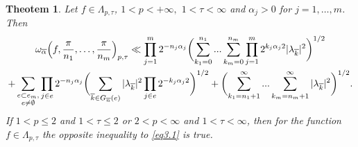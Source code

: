 \documentclass[12pt]{article}
\theoremstyle{plain}
\newtheorem{theorem}{Theotem}[section]
\begin{document}
\begin{theorem}\label{th3.2} 
Let $f \in \Lambda_{p ,\tau}$, $1 < p < +\infty,$ $1< \tau< \infty$ and $\alpha_{j}> 0$ for $j=1,\ldots,m$.
Then 
\begin{multline}\label{eq3.1}
 \omega_{\overline\alpha}\Bigl(f,\frac{\pi}{n_{1}},\ldots, \frac{\pi}{n_{m}}\Bigr)_{p, \tau}  \ll \prod_{j=1}^{m}2^{-n_{j}\alpha_{j}}\biggl(\sum\limits_{k_{1}=0}^{n_{1}}...\sum\limits_{k_{m}=0}^{n_{m}}\prod_{j=1}^{m}2^{k_{j}\alpha_{j}2}|\lambda_{\overline{k}}|^{2} \biggr)^{1/2}
 \\
  + \sum_{\substack{e\subset e_{m},\\ e\neq \emptyset}} \prod_{j\in e}2^{-n_{j}\alpha_{j}}\biggl(\sum\limits_{\overline{k}\in G_{\overline{n}}(e)}|\lambda_{\overline{k}}|^{2}\prod_{j\in e}2^{-k_{j}\alpha_{j}2} \biggr)^{1/2} + \biggl(\sum\limits_{k_{1}=n_{1}+1}^{\infty}...\sum\limits_{k_{m}=n_{m}+1}^{\infty}|\lambda_{\overline{k}}|^{2} \biggr)^{1/2}.
\end{multline} 
If $1<p\leqslant 2$ and $1<\tau \leqslant 2$ or $2< p<\infty$ and $1<\tau <\infty$, then for 
the function $f \in \Lambda_{p ,\tau}$ the opposite inequality to \eqref{eq3.1} is true.
 \end{theorem}
\end{document}
